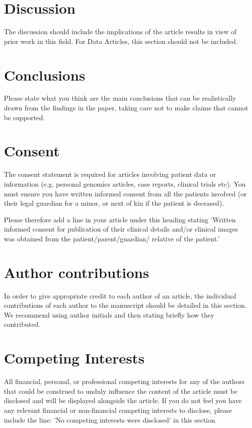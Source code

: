 \documentclass[10pt]{article}
\begin{document}
\section*{Discussion}
The discussion should include the implications of the article results in view of prior work in this field.
For Data Articles, this section should not be included.


\section*{Conclusions}
Please state what you think are the main conclusions that can be realistically drawn from the findings in the paper, taking care not to make claims that cannot be supported.

\section*{Consent}
The consent statement is required for articles involving patient data or information (e.g. personal genomics articles, case reports, clinical trials etc). You must ensure you have written informed consent from all the patients involved (or their legal guardian for a minor, or next of kin if the patient is deceased).

Please therefore add a line in your article under this heading stating 'Written informed consent for publication of their clinical details and/or clinical images was obtained from the patient/parent/guardian/ relative of the patient.'

\section*{Author contributions}
In order to give appropriate credit to each author of an article, the individual contributions of each author to the manuscript should be detailed in this section. We recommend using author initials and then stating briefly how they contributed.

\section*{Competing Interests}
All financial, personal, or professional competing interests for any of the authors that could be construed to unduly influence the content of the article must be disclosed and will be displayed alongside the article.
If you do not feel you have any relevant financial or non-financial competing interests to disclose, please include the line: 'No competing interests were disclosed' in this section.
\end{document}
